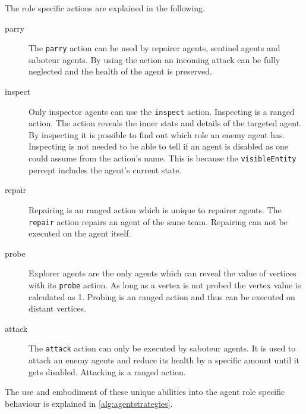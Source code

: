 The role specific actions are explained in the following. 
\begin{description}
   \item[parry] The \texttt{parry} action can be used by repairer agents, sentinel agents and saboteur agents. 
    By using the action an incoming attack can be fully neglected  and the health of the agent is preserved.
   \item[inspect] Only inspector agents can use the \texttt{inspect} action. Inspecting is a ranged action. 
    The action reveals the inner stats and details of the targeted agent. 
    By inspecting it is possible to find out which role an enemy agent has. 
    Inspecting is not needed to be able to tell if an agent is disabled as one could assume from the action's name. 
    This is because the \texttt{visibleEntity} percept includes the agent's current state.
   \item[repair] Repairing is an ranged action which is unique to repairer agents. The \texttt{repair} action repairs an agent of the same team. 
    Repairing can not be executed on the agent itself.
   \item[probe] Explorer agents are the only agents which can reveal the value of vertices with its \texttt{probe} action.
    As long as a vertex is not probed the vertex value is calculated as 1. Probing is an ranged action and thus can be executed on distant vertices.
   \item[attack] The \texttt{attack} action can only be executed by saboteur agents. It is used to attack an enemy agents and reduce its health by a specific amount until it gets disabled. Attacking is a ranged action.   
\end{description}

The use and embodiment of these unique abilities into the agent role specific behaviour is explained in \autoref{alg:agentstrategies}.
